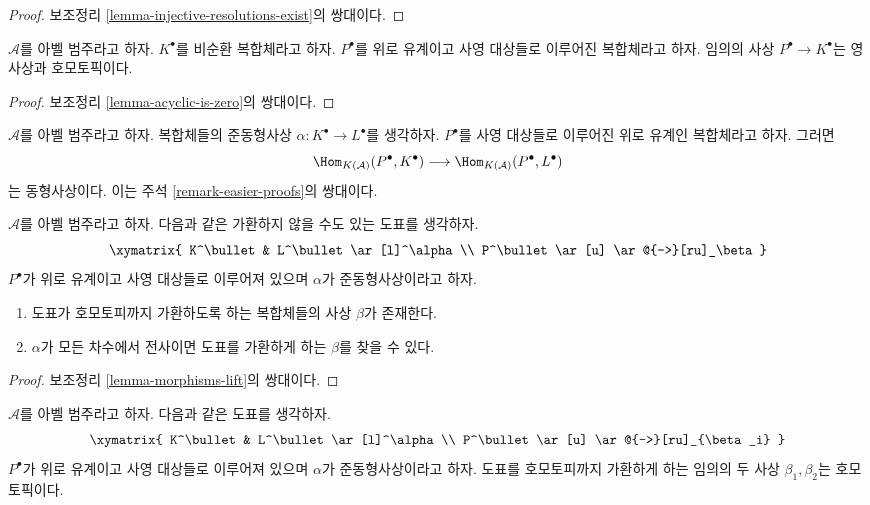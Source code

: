 \begin{proof}
보조정리 \ref{lemma-injective-resolutions-exist}의 쌍대이다.
\end{proof}

\begin{lemma}
\label{lemma-projective-into-acyclic-is-zero}
$\mathcal{A}$를 아벨 범주라고 하자.
$K^\bullet$를 비순환 복합체라고 하자.
$P^\bullet$를 위로 유계이고 사영 대상들로 이루어진 복합체라고 하자.
임의의 사상 $P^\bullet \to K^\bullet$는 영사상과 호모토픽이다.
\end{lemma}

\begin{proof}
보조정리 \ref{lemma-acyclic-is-zero}의 쌍대이다.
\end{proof}

\begin{remark}
\label{remark-easier-projective}
$\mathcal{A}$를 아벨 범주라고 하자.
복합체들의 준동형사상 $\alpha : K^\bullet \to L^\bullet$를 생각하자.
$P^\bullet$를 사영 대상들로 이루어진 위로 유계인 복합체라고 하자.
그러면
$$
\Hom_{K(\mathcal{A})}(P^\bullet, K^\bullet)
\longrightarrow
\Hom_{K(\mathcal{A})}(P^\bullet, L^\bullet)
$$
는 동형사상이다. 이는 주석 \ref{remark-easier-proofs}의 쌍대이다.
\end{remark}

\begin{lemma}
\label{lemma-morphisms-lift-projective}
$\mathcal{A}$를 아벨 범주라고 하자.
다음과 같은 가환하지 않을 수도 있는 도표를 생각하자.
$$
\xymatrix{
K^\bullet & L^\bullet \ar[l]^\alpha \\
P^\bullet \ar[u] \ar@{-->}[ru]_\beta
}
$$
$P^\bullet$가 위로 유계이고 사영 대상들로 이루어져 있으며
$\alpha$가 준동형사상이라고 하자.
\begin{enumerate}
\item 도표가 호모토피까지 가환하도록 하는 복합체들의 사상
$\beta$가 존재한다.
\item $\alpha$가 모든 차수에서 전사이면 도표를 가환하게 하는
$\beta$를 찾을 수 있다.
\end{enumerate}
\end{lemma}

\begin{proof}
보조정리 \ref{lemma-morphisms-lift}의 쌍대이다.
\end{proof}

\begin{lemma}
\label{lemma-morphisms-equal-up-to-homotopy-projective}
$\mathcal{A}$를 아벨 범주라고 하자. 다음과 같은 도표를 생각하자.
$$
\xymatrix{
K^\bullet & L^\bullet \ar[l]^\alpha \\
P^\bullet \ar[u] \ar@{-->}[ru]_{\beta_i}
}
$$
$P^\bullet$가 위로 유계이고 사영 대상들로 이루어져 있으며
$\alpha$가 준동형사상이라고 하자.
도표를 호모토피까지 가환하게 하는 임의의 두 사상
$\beta_1, \beta_2$는 호모토픽이다.
\end{lemma}


